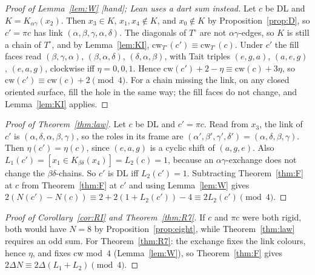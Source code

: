 \documentclass[11pt]{article}
\theoremstyle{definition}
\newcommand{\lab}[1]{\textsf{[#1]}}
\newcommand{\cw}{\mathrm{cw}}
\begin{document}
\begin{proof}[Proof of Lemma~\ref{lem:W} \lab{hand}; Lean uses a dart sum instead]
Let $c$ be DL and $K=K_{\alpha\gamma}(x_2)$. Then $x_3\in K$, $x_1,x_4\notin K$, and $x_0\notin K$ by Proposition~\ref{prop:D}, so $c'=\pi c$ has link $(\alpha,\beta,\gamma,\alpha,\delta)$. The diagonals of $T^\circ$ are not $\alpha\gamma$-edges, so $K$ is still a chain of $T^\circ$, and by Lemma~\ref{lem:KI}, $\cw_{T^\circ}(c')\equiv\cw_{T^\circ}(c)$. Under $c'$ the fill faces read $(\beta,\gamma,\alpha)$, $(\beta,\alpha,\delta)$, $(\delta,\alpha,\beta)$, with Tait triples $(e,g,a)$, $(a,e,g)$, $(e,a,g)$, clockwise iff $\eta=0,0,1$. Hence $\cw(c')+2-\eta\equiv\cw(c)+3\eta$, so $\cw(c')\equiv\cw(c)+2\pmod 4$. For a chain missing the link, on any closed oriented surface, fill the hole in the same way; the fill faces do not change, and Lemma~\ref{lem:KI} applies.
\end{proof}

\begin{proof}[Proof of Theorem~\ref{thm:law}]
Let $c$ be DL and $c'=\pi c$. Read from $x_3$, the link of $c'$ is $(\alpha,\delta,\alpha,\beta,\gamma)$, so the roles in its frame are $(\alpha',\beta',\gamma',\delta')=(\alpha,\delta,\beta,\gamma)$. Then $\eta(c')=\eta(c)$, since $(e,a,g)$ is a cyclic shift of $(a,g,e)$. Also $L_1(c')=[x_1\in K_{\beta\delta}(x_4)]=L_2(c)=1$, because an $\alpha\gamma$-exchange does not change the $\beta\delta$-chains. So $c'$ is DL iff $L_2(c')=1$. Subtracting Theorem~\ref{thm:F} at $c$ from Theorem~\ref{thm:F} at $c'$ and using Lemma~\ref{lem:W} gives $2(N(c')-N(c))\equiv 2+2(1+L_2(c'))-4\equiv 2L_2(c')\pmod 4$.
\end{proof}

\begin{proof}[Proof of Corollary~\ref{cor:RI} and Theorem~\ref{thm:R7}]
If $c$ and $\pi c$ were both rigid, both would have $N=8$ by Proposition~\ref{prop:eight}, while Theorem~\ref{thm:law} requires an odd sum. For Theorem~\ref{thm:R7}: the exchange fixes the link colours, hence $\eta$, and fixes $\cw$ mod~4 (Lemma~\ref{lem:W}), so Theorem~\ref{thm:F} gives $2\Delta N\equiv2\Delta(L_1+L_2)\pmod 4$.
\end{proof}
\end{document}
